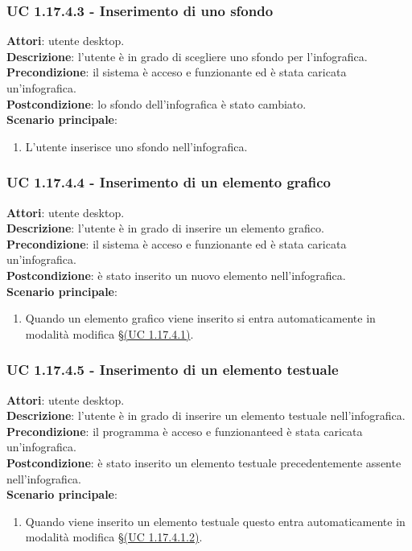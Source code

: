 \subsubsection{UC 1.17.4.3 - Inserimento di uno sfondo}{
	\label{uc1.17.4.3}
	\textbf{Attori}: utente desktop. \\
	\textbf{Descrizione}: l'utente è in grado di scegliere uno sfondo per l'infografica. \\
	\textbf{Precondizione}: il sistema è acceso e funzionante ed è stata caricata un'infografica.	\\
	\textbf{Postcondizione}: lo sfondo dell'infografica è stato cambiato.\\
	\textbf{Scenario principale}:
	\begin{enumerate}
		\item L'utente inserisce uno sfondo nell'infografica.
	\end{enumerate}			
	}
\subsubsection{UC 1.17.4.4 - Inserimento di un elemento grafico}{
	\label{uc1.17.4.4}
	\textbf{Attori}: utente desktop. \\
	\textbf{Descrizione}: l'utente è in grado di inserire un elemento grafico. \\
	\textbf{Precondizione}: il sistema è acceso e funzionante ed è stata caricata un'infografica.	\\
	\textbf{Postcondizione}: è stato inserito un nuovo elemento nell'infografica.\\
	\textbf{Scenario principale}:
	\begin{enumerate}
		\item Quando un elemento grafico viene inserito si entra automaticamente in modalità modifica \S\hyperref[uc1.17.4.1]{(UC 1.17.4.1)}.
	\end{enumerate}
	}
\subsubsection{UC 1.17.4.5 - Inserimento di un elemento testuale}{
	\label{uc1.17.4.5}
	\textbf{Attori}: utente desktop. \\
	\textbf{Descrizione}: l'utente è in grado di inserire un elemento testuale nell'infografica. \\
	\textbf{Precondizione}: il programma è acceso e funzionanteed è stata caricata un'infografica.	\\
	\textbf{Postcondizione}: è stato inserito un elemento testuale precedentemente assente nell'infografica.	\\
	\textbf{Scenario principale}:
	\begin{enumerate}
		\item Quando viene inserito un elemento testuale questo entra automaticamente in modalità modifica \S\hyperref[uc1.17.4.1.2]{(UC 1.17.4.1.2)}.
	\end{enumerate}
	}
